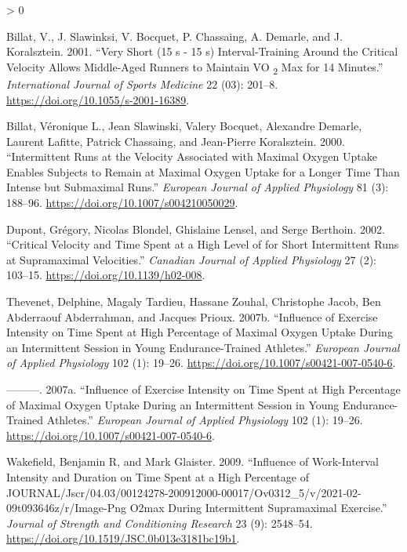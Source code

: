 \documentclass[
]{article}
\newlength{\cslhangindent}
\newenvironment{CSLReferences}[2] %
 {%
  \setlength{\parindent}{0pt}
  \ifodd #1 \everypar{\setlength{\hangindent}{\cslhangindent}}\ignorespaces\fi
  \ifnum #2 > 0
  \setlength{\parskip}{#2\baselineskip}
  \fi
 }%
 {}
\begin{document}
\hypertarget{refs}{}
\begin{CSLReferences}{1}{0}
\leavevmode\hypertarget{ref-billat2001}{}%
Billat, V., J. Slawinksi, V. Bocquet, P. Chassaing, A. Demarle, and J.
Koralsztein. 2001. {``Very Short (15 s - 15 s) Interval-Training Around
the Critical Velocity Allows Middle-Aged Runners to Maintain V{{}}O
{\textsubscript{2}} Max for 14 Minutes.''} \emph{International Journal
of Sports Medicine} 22 (03): 201--8.
\url{https://doi.org/10.1055/s-2001-16389}.

\leavevmode\hypertarget{ref-billat2000}{}%
Billat, Véronique L., Jean Slawinski, Valery Bocquet, Alexandre Demarle,
Laurent Lafitte, Patrick Chassaing, and Jean-Pierre Koralsztein. 2000.
{``Intermittent Runs at the Velocity Associated with Maximal Oxygen
Uptake Enables Subjects to Remain at Maximal Oxygen Uptake for a Longer
Time Than Intense but Submaximal Runs.''} \emph{European Journal of
Applied Physiology} 81 (3): 188--96.
\url{https://doi.org/10.1007/s004210050029}.

\leavevmode\hypertarget{ref-dupont2002}{}%
Dupont, Grégory, Nicolas Blondel, Ghislaine Lensel, and Serge Berthoin.
2002. {``Critical Velocity and Time Spent at a High Level of for Short
Intermittent Runs at Supramaximal Velocities.''} \emph{Canadian Journal
of Applied Physiology} 27 (2): 103--15.
\url{https://doi.org/10.1139/h02-008}.

\leavevmode\hypertarget{ref-thevenet2007a}{}%
Thevenet, Delphine, Magaly Tardieu, Hassane Zouhal, Christophe Jacob,
Ben Abderraouf Abderrahman, and Jacques Prioux. 2007b. {``Influence of
Exercise Intensity on Time Spent at High Percentage of Maximal Oxygen
Uptake During an Intermittent Session in Young Endurance-Trained
Athletes.''} \emph{European Journal of Applied Physiology} 102 (1):
19--26. \url{https://doi.org/10.1007/s00421-007-0540-6}.

\leavevmode\hypertarget{ref-thevenet2007}{}%
---------. 2007a. {``Influence of Exercise Intensity on Time Spent at
High Percentage of Maximal Oxygen Uptake During an Intermittent Session
in Young Endurance-Trained Athletes.''} \emph{European Journal of
Applied Physiology} 102 (1): 19--26.
\url{https://doi.org/10.1007/s00421-007-0540-6}.

\leavevmode\hypertarget{ref-wakefield2009}{}%
Wakefield, Benjamin R, and Mark Glaister. 2009. {``Influence of
Work-Interval Intensity and Duration on Time Spent at a High Percentage
of
JOURNAL/Jscr/04.03/00124278-200912000-00017/Ov0312{\_}5/v/2021-02-09t093646z/r/Image-Png
O2max During Intermittent Supramaximal Exercise.''} \emph{Journal of
Strength and Conditioning Research} 23 (9): 2548--54.
\url{https://doi.org/10.1519/JSC.0b013e3181bc19b1}.

\end{CSLReferences}
\end{document}
